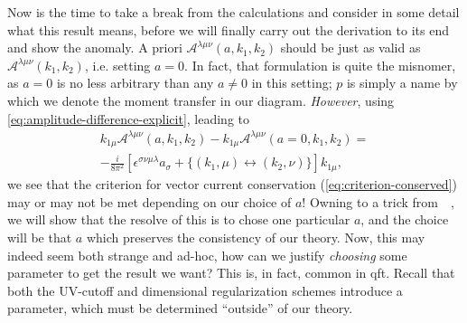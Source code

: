 Now is the time to take a break from the calculations and consider in some detail what this result means, before we will finally carry out the derivation to its end and show the anomaly.
A priori $\mathcal{A}^{\lambda \mu \nu }(a, k_1, k_2)$ should be just as valid as $\mathcal{A}^{\lambda \mu \nu }(k_1,  k_2)$, i.e. setting $a=0$.
In fact, that formulation is quite the misnomer, as $a=0$ is no less arbitrary than any $a\neq 0$ in this setting;
$p$ is simply a name by which we denote the moment transfer in our diagram.
\emph{However}, using \cref{eq:amplitude-difference-explicit}, leading to
\begin{multline}
  \label{eq:19}
  k_{1\mu } \mathcal{A}^{\lambda \mu \nu }(a, k_1, k_2) - k_{1\mu }\mathcal{A}^{\lambda \mu \nu }(a=0, k_1, k_2) =\\
  -\frac{i}{8\pi^2} \left[
  \epsilon ^{\sigma \nu \mu \lambda } a_{\sigma } +  \{(k_1,\mu ) \leftrightarrow (k_2, \nu )\} \right] k_{1\mu }, 
\end{multline}
we see that the criterion for vector current conservation (\ref{eq:criterion-conserved}) may or may not be met depending on our choice of $a$!
Owning to a trick from~\citeauthor{zeeQuantumFieldTheory2010}~\cite{zeeQuantumFieldTheory2010}, we will show that the resolve of this is to chose one particular $a$, and the choice will be that $a$ which preserves the consistency of our theory.
Now, this may indeed seem both strange and ad-hoc, how can we justify \emph{choosing} some parameter to get the result we want?
This is, in fact, common in \gls{qft}.
Recall that both the UV-cutoff and dimensional regularization schemes introduce a parameter, which must be determined ``outside'' of our theory.

